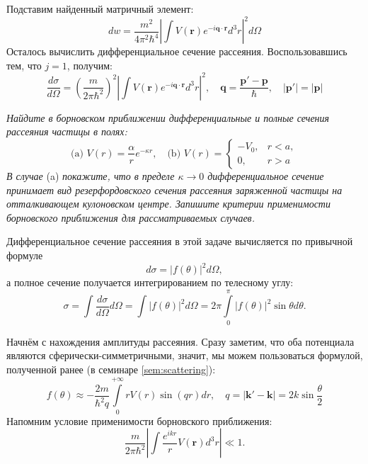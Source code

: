 Подставим найденный матричный элемент:
\[
  dw = \frac{m^2}{4\pi^2\hbar^4}\left|\int
  V(\mathbf{r})e^{-i\mathbf{q}\cdot \mathbf{r}}d^3 r\right|^2d\Omega
\]
Осталось вычислить дифференциальное сечение рассеяния. Воспользовавшись тем,
что $j=1$, получим:
\[
  \frac{d\sigma}{d\Omega} = \left(\frac{m}{2\pi\hbar^2}\right)^2\left|\int
  V(\mathbf{r})e^{-i\mathbf{q}\cdot\mathbf{r}}d^3 r\right|^2, \quad \mathbf{q} =
  \frac{\mathbf{p'}-\mathbf{p}}{\hbar}, \quad |\mathbf{p'}| = |\mathbf{p}|
\]
\qedsq

\begin{exercise}
  \textit{Найдите в борновском приближении дифференциальные и полные сечения
    рассеяния частицы в полях:}
  \[
    \text{(a) } V(r) = \frac{\alpha}{r}e^{-\kappa r},
    \quad \text{(b) } V(r) = \begin{cases}
      -V_0, & r<a, \\ 0, & r>a
    \end{cases}
  \]
  \textit{В случае }(a) \textit{покажите, что в пределе $\kappa\to0$
    дифференциальное сечение принимает вид резерфордовского сечения рассеяния
    заряженной частицы на отталкивающем кулоновском центре. Запишите критерии
    применимости борновского приближения для рассматриваемых случаев.}
\end{exercise}
Дифференциальное сечение рассеяния в этой задаче вычисляется по привычной
формуле
\[
  d\sigma = |f(\theta)|^2 d\Omega,
\]
а полное сечение получается интегрированием по телесному углу:
\[
  \sigma = \int\frac{d\sigma}{d\Omega}d\Omega = \int|f(\theta)|^2d\Omega =
  2\pi\int\limits_0^{\pi} |f(\theta)|^2\sin\theta d\theta.
\]

Начнём с нахождения амплитуды рассеяния. Сразу заметим, что оба потенциала
являются сферически-симметричными, значит, мы можем пользоваться формулой,
полученной ранее (в семинаре \ref{sem:scattering}):
\[
  f(\theta) \approx -\frac{2m}{\hbar^2q}\int\limits_0^{+\infty} r
  V(r)\sin (qr)dr, \quad q = |\mathbf{k}'-\mathbf{k}| = 2k\sin\frac{\theta}{2}
\]
Напомним условие применимости борновского приближения:
\[
  \frac{m}{2\pi\hbar^2}\left|\int\frac{e^{ikr}}{r}V(\mathbf{r})d^3r\right| \ll 1.
\]


